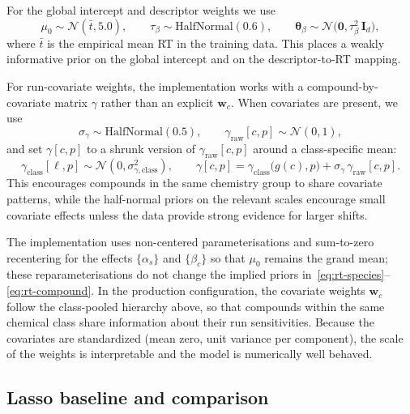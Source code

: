 \documentclass[11pt]{article}
\begin{document}
For the global intercept and descriptor weights we use
\begin{equation}
  \mu_0\sim\mathcal{N}(\bar{t},5.0),
  \qquad
  \tau_\beta\sim\mathrm{HalfNormal}(0.6),
  \qquad
  \bm{\theta}_\beta\sim\mathcal{N}\bigl(\bm{0},\tau_\beta^2\,\bm{I}_d\bigr),
\end{equation}
where $\bar{t}$ is the empirical mean RT in the training data. This places a weakly
informative prior on the global intercept and on the descriptor-to-RT mapping.

For run-covariate weights, the implementation works with a compound-by-covariate
matrix $\gamma$ rather than an explicit $\bm{w}_c$. When covariates are present, we
use
\begin{equation}
  \sigma_\gamma\sim\mathrm{HalfNormal}(0.5),
  \qquad
  \gamma_{\text{raw}}[c,p]\sim\mathcal{N}(0,1),
\end{equation}
and set $\gamma[c,p]$ to a shrunk version of $\gamma_{\text{raw}}[c,p]$ around a
class-specific mean:
\begin{equation}
  \gamma_{\mathrm{class}}[\ell,p]\sim\mathcal{N}(0,\sigma^2_{\gamma,\mathrm{class}}),
  \qquad
  \gamma[c,p] = \gamma_{\mathrm{class}}\bigl(g(c),p\bigr)
                + \sigma_\gamma\,\gamma_{\text{raw}}[c,p].
\end{equation}
This encourages compounds in the same chemistry group to share covariate patterns,
while the half-normal priors on the relevant scales encourage small covariate
effects unless the data provide strong evidence for larger shifts.

The implementation uses non-centered parameterisations and sum-to-zero recentering
for the effects $\{\alpha_s\}$ and $\{\beta_c\}$ so that $\mu_0$ remains the grand
mean; these reparameterisations do not change the implied priors
in~\eqref{eq:rt-species}--\eqref{eq:rt-compound}. In the production configuration,
the covariate weights $\bm{w}_c$ follow the class-pooled hierarchy above, so that
compounds within the same chemical class share information about their run
sensitivities. Because the covariates are standardized (mean zero, unit variance per
component), the scale of the weights is interpretable and the model is numerically
well behaved.

\subsection{Lasso baseline and comparison}
\label{subsec:hier-structure}
\end{document}
